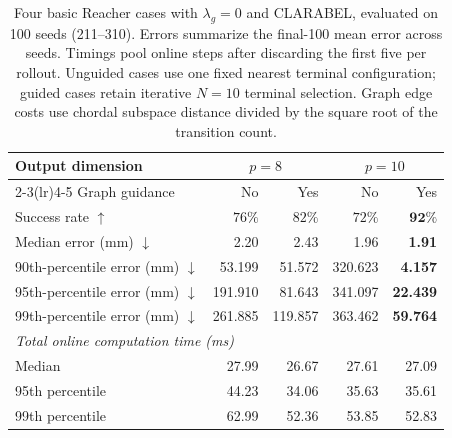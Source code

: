 \begin{table}[htbp]
\centering
\small
\begin{tabular}{lrrrr}
\toprule
Output dimension & \multicolumn{2}{c}{$p=8$} & \multicolumn{2}{c}{$p=10$} \\
\cmidrule(lr){2-3}\cmidrule(lr){4-5}
Graph guidance & No & Yes & No & Yes \\
\midrule
Success rate $\uparrow$ & $76\%$ & $82\%$ & $72\%$ & $\mathbf{92\%}$ \\
Median error (mm) $\downarrow$ & 2.20 & 2.43 & 1.96 & \textbf{1.91} \\
90th-percentile error (mm) $\downarrow$ & 53.199 & 51.572 & 320.623 & \textbf{4.157} \\
95th-percentile error (mm) $\downarrow$ & 191.910 & 81.643 & 341.097 & \textbf{22.439} \\
99th-percentile error (mm) $\downarrow$ & 261.885 & 119.857 & 363.462 & \textbf{59.764} \\
\midrule
\multicolumn{5}{l}{\textit{Total online computation time (ms)}} \\
Median & 27.99 & 26.67 & 27.61 & 27.09 \\
95th percentile & 44.23 & 34.06 & 35.63 & 35.61 \\
99th percentile & 62.99 & 52.36 & 53.85 & 52.83 \\
\bottomrule
\end{tabular}
\caption{Four basic Reacher cases with $\lambda_g=0$ and CLARABEL, evaluated on 100 seeds (211--310). Errors summarize the final-100 mean error across seeds. Timings pool online steps after discarding the first five per rollout. Unguided cases use one fixed nearest terminal configuration; guided cases retain iterative $N=10$ terminal selection. Graph edge costs use chordal subspace distance divided by the square root of the transition count.}
\label{tab:basic-cases-clarabel-lamg0}
\end{table}

